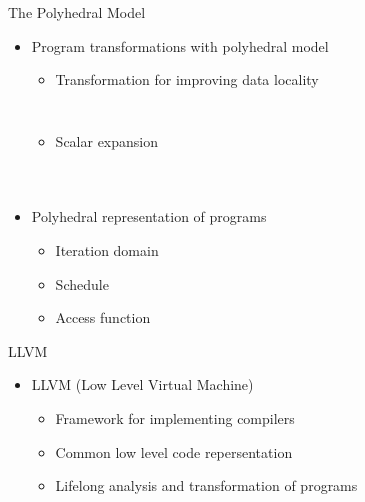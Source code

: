 \documentclass{beamer}
\begin{document}
\begin{frame}[fragile]{The Polyhedral Model}
\begin{itemize}
\item Program transformations with polyhedral model
	\begin{itemize}
	\item Transformation for improving data locality
	\begin{columns}[t]
		\begin{block}{ }
	{\tiny}
		\end{block}
	\pause
		\column{.5\textwidth}
		\begin{block}{ }
	{\tiny}
		\end{block}
	\end{columns}
	\pause

	\item Scalar expansion
	\pause
	\begin{columns}[t]
		\begin{block}{ }
		{\tiny}
		\end{block}
	\pause
		\column{.5\textwidth}
		\begin{block}{ }
		{\tiny}
		\end{block}
	\end{columns}
        \pause
	\begin{columns}
	\column{0.5\textwidth}
		\begin{block}{ }
		{\tiny}
		\end{block}
		\end{columns}
	\end{itemize}
\item Polyhedral representation of programs
	\begin{itemize}
	\item Iteration domain
	\item Schedule
	\item Access function
	\end{itemize}
\end{itemize}
\end{frame}




\begin{frame}{LLVM}
\begin{itemize}
\item LLVM (Low Level Virtual Machine)
	\begin{itemize}
	\item Framework for implementing compilers
	\item Common low level code repersentation
	\item Lifelong analysis and transformation of programs
	\end{itemize}
\end{itemize}
\end{frame}
\end{document}
